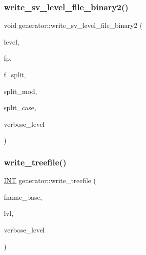 \subsubsection{\texorpdfstring{write\+\_\+sv\+\_\+level\+\_\+file\+\_\+binary2()}{write\_sv\_level\_file\_binary2()}}
{\footnotesize\ttfamily void generator\+::write\+\_\+sv\+\_\+level\+\_\+file\+\_\+binary2 (\begin{DoxyParamCaption}\item[{\mbox{\hyperlink{galois_8h_a09fddde158a3a20bd2dcadb609de11dc}{I\+NT}}}]{level,  }\item[{F\+I\+LE $\ast$}]{fp,  }\item[{\mbox{\hyperlink{galois_8h_a09fddde158a3a20bd2dcadb609de11dc}{I\+NT}}}]{f\+\_\+split,  }\item[{\mbox{\hyperlink{galois_8h_a09fddde158a3a20bd2dcadb609de11dc}{I\+NT}}}]{split\+\_\+mod,  }\item[{\mbox{\hyperlink{galois_8h_a09fddde158a3a20bd2dcadb609de11dc}{I\+NT}}}]{split\+\_\+case,  }\item[{\mbox{\hyperlink{galois_8h_a09fddde158a3a20bd2dcadb609de11dc}{I\+NT}}}]{verbose\+\_\+level }\end{DoxyParamCaption})}

\mbox{\label{classgenerator_a5c684cbe4faa75f676549200c475f5c3}} 
\subsubsection{\texorpdfstring{write\+\_\+treefile()}{write\_treefile()}}
{\footnotesize\ttfamily \mbox{\hyperlink{galois_8h_a09fddde158a3a20bd2dcadb609de11dc}{I\+NT}} generator\+::write\+\_\+treefile (\begin{DoxyParamCaption}\item[{\mbox{\hyperlink{galois_8h_ab6cc7b4aeb6ea31aba2b3fbfc83ff5e6}{B\+Y\+TE}} $\ast$}]{fname\+\_\+base,  }\item[{\mbox{\hyperlink{galois_8h_a09fddde158a3a20bd2dcadb609de11dc}{I\+NT}}}]{lvl,  }\item[{\mbox{\hyperlink{galois_8h_a09fddde158a3a20bd2dcadb609de11dc}{I\+NT}}}]{verbose\+\_\+level }\end{DoxyParamCaption})}

\mbox{\label{classgenerator_a70c78f45dba413014287e8cde2f7d6b5}} 
